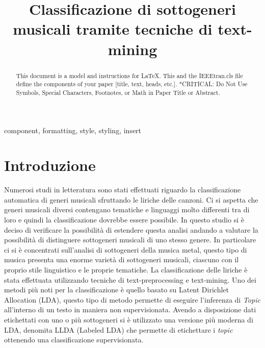 \documentclass[technote]{IEEEtran}
\begin{document}
\title{Classificazione di sottogeneri musicali tramite tecniche di text-mining}

\author{
\and
{}
\and
{}
}

\maketitle

\begin{abstract}
This document is a model and instructions for \LaTeX.
This and the IEEEtran.cls file define the components of your paper [title, text, heads, etc.]. *CRITICAL: Do Not Use Symbols, Special Characters, Footnotes, 
or Math in Paper Title or Abstract.
\end{abstract}

\begin{IEEEkeywords}
component, formatting, style, styling, insert
\end{IEEEkeywords}

\section{Introduzione}
Numerosi studi in letteratura sono stati effettuati riguardo la classificazione automatica di generi musicali sfruttando le liriche delle canzoni. Ci si aspetta che generi musicali diversi contengano tematiche e linguaggi molto differenti tra di loro e quindi la classificazione dovrebbe essere possibile. In questo studio si è deciso di verificare la possibilità di estendere questa analisi andando a valutare la possibilità di distinguere sottogeneri musicali di uno stesso genere. In particolare ci si è concentrati sull'analisi di sottogeneri della musica metal, questo tipo di musica presenta una enorme varietà di sottogeneri musicali, ciascuno con il proprio stile linguistico e le proprie tematiche.
La classificazione delle liriche è stata effettuata utilizzando tecniche di text-preprocessing e text-mining. Uno dei metodi più noti per la classificazione è quello basato su Latent Dirichlet Allocation (LDA), questo tipo di metodo permette di eseguire l'inferenza di \textit{Topic} all'interno di un testo in maniera non supervisionata.
Avendo a disposizione dati etichettati con uno o più sottogeneri si è utilizzato una versione più moderna di LDA, denomita LLDA (Labeled LDA) che permette di etichettare i \textit{topic} ottenendo una classificazione supervisionata.  
\end{document}
